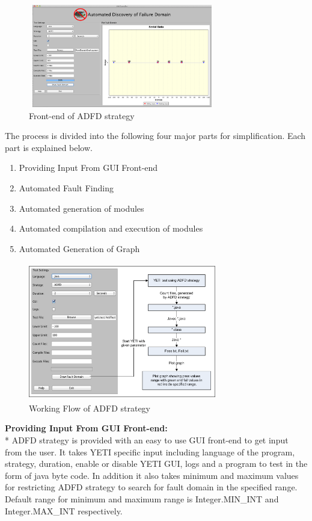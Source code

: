 \documentclass{acm_proc_article-sp}
\begin{document}
\begin{figure}[ht]
\centering
\includegraphics[width=8.2cm,height=4.5cm]{ADFD-front-end.png}
\caption{Front-end of ADFD strategy}
\label{fig:ADFD}
\end{figure}


The process is divided into the following four major parts for simplification. Each part is explained below.

\begin{enumerate}
\item Providing Input From GUI Front-end
\item Automated Fault Finding
\item Automated generation of modules
\item Automated compilation and execution of modules
\item Automated Generation of Graph
\end{enumerate}

\begin{figure}[ht]
\centering
\includegraphics[width=8.2cm,height=6cm]{ADFD-Diagram1.png}
\caption{Working Flow of ADFD strategy}
\label{fig:ADFD}
\end{figure}

\noindent \textbf{Providing Input From GUI Front-end:}\\*
ADFD strategy is provided with an easy to use GUI front-end to get input from the user. It takes YETI specific input including language of the program, strategy, duration, enable or disable YETI GUI, logs and a program to test in the form of java byte code. In addition it also takes minimum and maximum values for restricting ADFD strategy to search for fault domain in the specified range. Default range for minimum and maximum range is Integer.MIN\_INT and Integer.MAX\_INT respectively. 
\end{document}

